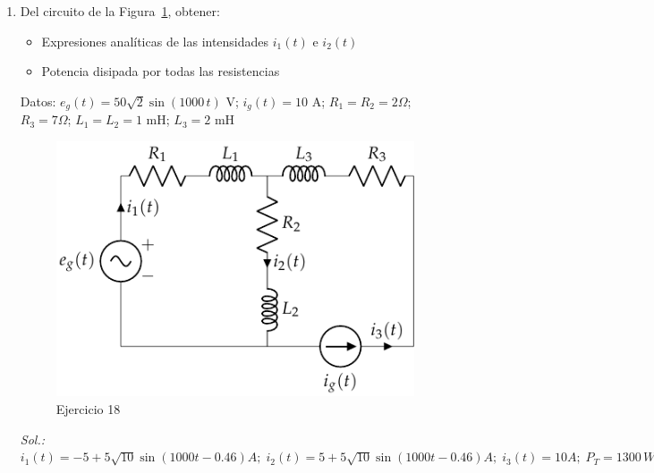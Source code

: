\begin{enumerate}
\item {Del circuito de la Figura~\ref{fig.ej18_BT2}, obtener:
    \begin{itemize}
        \item Expresiones analíticas de las intensidades $i_1(t)$ e $i_2(t)$
        \item Potencia disipada por todas las resistencias
    \end{itemize}}
Datos: $e_g(t)=50\sqrt{2}\sin(1000\,t)$ V; $i_g(t)=10$ A; $R_1=R_2=2\Omega$; $R_3=7\Omega$; $L_1=L_2=1$ mH; $L_3=2$ mH
\begin{figure}[H]
    \centering
    \includegraphics{../figs/ej18_BT2.pdf}
    \caption{Ejercicio 18}
    \label{fig.ej18_BT2}
\end{figure}
\emph{Sol.: $i_1(t)= -5+5\sqrt{10}\sin(1000t-0.46) A;\; i_2(t)= 5+5\sqrt{10}\sin(1000t-0.46) A;\; i_3(t)= 10 A;\; P_T=1300\,W$}


\end{enumerate}
